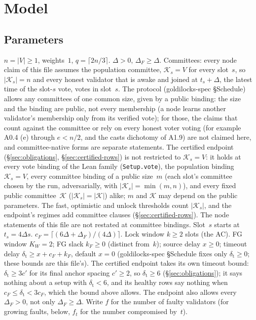 \documentclass{article}
\newcommand{\cF}{c_F}
\begin{document}
\section{Model}\label{sec:model}

\subsection{Parameters}

$n=|V|\geq1$, weights~$1$, $q=\lceil 2n/3\rceil$.  $\Delta>0$, $\Delta_F\geq\Delta$.
Committees: every node claim of this file assumes the population committee,
$\mathcal K_s=V$ for every slot~$s$, so $|\mathcal K_s|=n$ and every honest validator that is awake and joined
at $t_s+\Delta$, the latest time of the slot-$s$ vote, votes in slot~$s$.  The protocol
(goldilocks-spec \S Schedule) allows any committees of one common size,
given by a public binding: the size and the binding are public, not every
membership (a node learns another validator's membership only from its
verified vote); for those, the claims that count against the committee or rely on
every honest voter voting (for example A0.4 (e) through $e<n/2$, and the
casts dichotomy of A1.9) are not claimed here, and committee-native forms
are separate statements.  The certified endpoint (\S\ref{sec:obligations},
\S\ref{sec:certified-rows}) is not restricted to $\mathcal K_s=V$: it holds
at every vote binding of the Lean family (\texttt{Setup.vote}), the
population binding $\mathcal K_s=V$, every committee binding of a public
size~$m$ (each slot's committee chosen by the run, adversarially, with
$|\mathcal K_s|=\min(m,n)$), and every fixed public committee~$\mathcal K$
($|\mathcal K_s|=|\mathcal K|$) alike; $m$ and $\mathcal K$ may depend on
the public parameters.  The fast, optimistic and unlock thresholds count
$|\mathcal K_s|$, and the endpoint's regimes add committee clauses
(\S\ref{sec:certified-rows}).
The node statements of this file are not restated at committee bindings.
Slot~$s$ starts at $t_s=4\Delta s$.  $\cF=\lceil(6\Delta+\Delta_F)/(4\Delta)\rceil$.
Lock window $k\geq2$ slots (the AC).  FG
window $K_W=2$; FG slack $k_F\geq0$ (distinct from~$k$); source delay
$x\geq0$; timeout delay $\delta_{\mathrm t}\geq x+\cF+k_F$, default $x=0$
(goldilocks-spec \S Schedule fixes only $\delta_{\mathrm t}\geq0$; these
bounds are this file's).  The certified endpoint takes its own timeout
bound: $\delta_{\mathrm t}\geq3c'$ for its final anchor spacing $c'\geq2$, so
$\delta_{\mathrm t}\geq6$ (\S\ref{sec:obligations}); it says nothing about
a setup with $\delta_{\mathrm t}<6$, and its healthy rows say nothing when
$\cF\leq\delta_{\mathrm t}<3\cF$, which the bound above allows.  The endpoint
also allows every $\Delta_F>0$, not only $\Delta_F\geq\Delta$.
Write $f$ for the number of faulty validators (for growing faults, below,
$f_t$ for the number compromised by~$t$).
\end{document}
